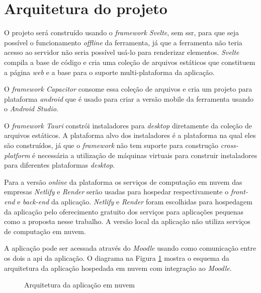 \section{Arquitetura do projeto}
O projeto será construído usando o \textit{framework Svelte}, sem \gls{ssr}, para que seja possível o funcionamento \textit{offline} da ferramenta, já que a ferramenta não teria acesso ao servidor não seria possível usá-lo para renderizar elementos. \textit{Svelte} compila a base de código e cria uma coleção de arquivos estáticos que constituem a página \textit{web} e a base para o suporte multi-plataforma da aplicação. 

O \textit{framework Capacitor} consome essa coleção de arquivos e cria um projeto para plataforma \textit{android} que é usado para criar a versão mobile da ferramenta usando o \textit{Android Studio}. 

O \textit{framework Tauri} constrói instaladores para \textit{desktop} diretamente da coleção de arquivos estáticos. A plataforma alvo dos instaladores é a plataforma na qual eles são construídos, já que o \textit{framework} não tem suporte para construção \textit{cross-platform} é necessária a utilização de máquinas virtuais para construir instaladores para diferentes plataformas \textit{desktop}.

Para a versão \textit{online} da plataforma os serviços de computação em nuvem das empresas \textit{Netlify} e \textit{Render} serão usadas para hospedar respectivamente o \textit{front-end} e \textit{back-end} da aplicação. \textit{Netlify} e \textit{Render} foram escolhidas para hospedagem da aplicação pelo oferecimento gratuito dos serviços para aplicações pequenas como a proposta nesse trabalho. A versão local da aplicação não utiliza serviços de computação em nuvem.

A aplicação pode ser acessada através do \textit{Moodle} usando como comunicação entre os dois a \gls{api} da aplicação. O diagrama na Figura \ref{fig:arqremo} mostra o esquema da arquitetura da aplicação hospedada em nuvem com integração ao \textit{Moodle}.

\begin{figure}[ht]
  \centering
  \captionsetup{width=16cm}
  \caption{Arquitetura da aplicação em nuvem}
  \label{fig:arqremo}
\end{figure}
\FloatBarrier

